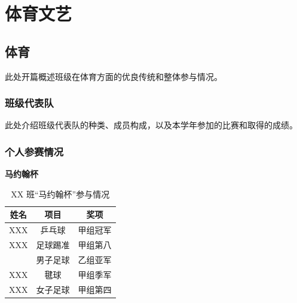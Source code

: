 \section{体育文艺}

\subsection{体育}

此处开篇概述班级在体育方面的优良传统和整体参与情况。

\subsubsection{班级代表队}

此处介绍班级代表队的种类、成员构成，以及本学年参加的比赛和取得的成绩。




\subsubsection{个人参赛情况}

\textbf{马约翰杯}

\begin{table}[H]
    \centering
    \begin{tabular}{||c|c|c||}
        \hline
        \hline
        姓名   & 项目       & 奖项       \\
        \hline
        XXX & 乒乓球     & 甲组冠军   \\
        \hline
        XXX & 足球踢准   & 甲组第八   \\
            & 男子足球   & 乙组亚军   \\
        \hline
        XXX & 毽球       & 甲组季军   \\
        \hline
        XXX & 女子足球   & 甲组第四   \\
        \hline
      \hline
    \end{tabular}
    \caption{XX 班``马约翰杯''参与情况}
\end{table}

